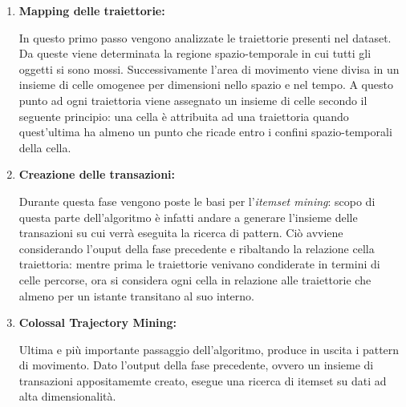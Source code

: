   \begin{enumerate}
    \item \textbf{Mapping delle traiettorie:}

    In questo primo passo vengono analizzate le traiettorie presenti nel dataset. Da queste viene determinata la regione spazio-temporale
    in cui tutti gli oggetti si sono mossi. Successivamente l'area di movimento viene divisa in un insieme di celle omogenee per dimensioni nello spazio e nel tempo.
    A questo punto ad ogni traiettoria viene assegnato un insieme di celle secondo il seguente principio: una cella è attribuita ad una traiettoria quando quest'ultima ha
    almeno un punto che ricade entro i confini spazio-temporali della cella.

    \item  \textbf{Creazione delle transazioni:}

    Durante questa fase vengono poste le basi per l'\textit{itemset mining}: scopo di questa parte dell'algoritmo
    è infatti andare a generare l'insieme delle transazioni su cui verrà eseguita la ricerca di pattern.
    Ciò avviene considerando l'ouput della fase precedente e ribaltando la relazione cella traiettoria:
    mentre prima le traiettorie venivano condiderate in termini di celle percorse, ora si considera ogni cella in relazione alle traiettorie che almeno per
    un istante transitano al suo interno.

    \item \textbf{Colossal Trajectory Mining:}

    Ultima e più importante passaggio dell'algoritmo, produce in uscita i pattern di movimento.
    Dato l'output della fase precedente, ovvero un insieme di transazioni appositamemte creato,
    esegue una ricerca di itemset su dati ad alta dimensionalità.

  \end{enumerate}





